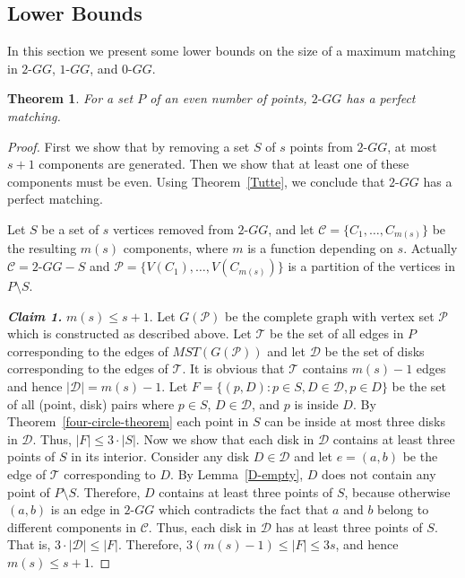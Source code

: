 \documentclass[11pt,a4paper]{article}
\newcommand{\kGG}[2]{$#1\text{-}GG#2$}
\newtheorem{theorem}{Theorem}
\begin{document}
\subsection{Lower Bounds}
\label{lower-bounds-section}

In this section we present some lower bounds on the size of a maximum matching in \kGG{2}{}, \kGG{1}{}, and \kGG{0}{}.

\begin{theorem}
 \label{matching-2GG}
For a set $P$ of an even number of points, \kGG{2}{} has a perfect matching.
\end{theorem}
\begin{proof}
First we show that by removing a set $S$ of $s$ points from \kGG{2}{}, at most $s+1$ components are generated. Then we show that at least one of these components must be even. Using Theorem~\ref{Tutte}, we conclude that \kGG{2}{} has a perfect matching.

Let $S$ be a set of $s$ vertices removed from \kGG{2}{}, and let $\mathcal{C}=\{C_1, \dots, C_{m(s)}\}$ be the resulting $m(s)$ components, where $m$ is a function depending on $s$. Actually $\mathcal{C}=\text{\kGG{2}{}}-S$ and $\mathcal{P}=\{V(C_1),\dots, V(C_{m(s)})\}$ is a partition of the vertices in $P\setminus S$. 

{\bf\em  Claim 1.} $m(s)\le s+1$. Let $G(\mathcal{P})$ be the complete graph with vertex set $\mathcal{P}$ which is constructed as described above. Let $\mathcal{T}$ be the set of all edges in $P$ corresponding to the edges of $MST(G(\mathcal{P}))$ and let $\mathcal{D}$ be the set of disks corresponding to the edges of $\mathcal{T}$. It is obvious that $\mathcal{T}$ contains $m(s)-1$ edges and hence $|\mathcal{D}|=m(s)-1$. Let $F=\{(p,D):p\in S, D\in \mathcal{D}, p\in D\}$ be the set of all (point, disk) pairs where $p\in S$, $D\in \mathcal{D}$, and $p$ is inside $D$. By Theorem~\ref{four-circle-theorem} each point in $S$ can be inside at most three disks in $\mathcal{D}$. Thus, $|F|\le 3\cdot|S|$.
Now we show that each disk in $\mathcal{D}$ contains at least three points of $S$ in its interior.  
Consider any disk $D\in \mathcal{D}$ and let $e=(a,b)$ be the edge of $\mathcal{T}$ corresponding to $D$. By Lemma~\ref{D-empty}, $D$ does not contain any point of $P\setminus S$. Therefore, $D$ contains at least three points of $S$, because otherwise $(a,b)$ is an edge in \kGG{2}{} which contradicts the fact that $a$ and $b$ belong to different components in $\mathcal{C}$. Thus, each disk in $\mathcal{D}$ has at least three points of $S$. That is, $3\cdot|\mathcal{D}|\le|F|$. Therefore, $3(m(s)-1)\le |F|\le 3s$, and hence $m(s)\le s+1$.


\end{proof}
\end{document}
